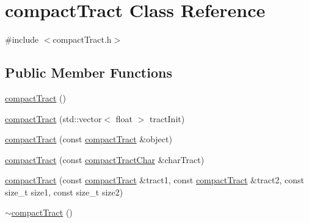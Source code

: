 \hypertarget{classcompactTract}{\section{compact\-Tract \-Class \-Reference}
\label{classcompactTract}
}


{\ttfamily \#include $<$compact\-Tract.\-h$>$}

\subsection*{\-Public \-Member \-Functions}
\begin{DoxyCompactItemize}
\item 
\hyperlink{classcompactTract_a768f98790c79a32ec890c2f8a860b868}{compact\-Tract} ()
\item 
\hyperlink{classcompactTract_a0df1b9bb6f933f77cb2a55b549944dec}{compact\-Tract} (std\-::vector$<$ float $>$ tract\-Init)
\item 
\hyperlink{classcompactTract_ab370799e5b1892c20e774ece5aae1988}{compact\-Tract} (const \hyperlink{classcompactTract}{compact\-Tract} \&object)
\item 
\hyperlink{classcompactTract_ae6dd8d553eecc27217c63338eafa155f}{compact\-Tract} (const \hyperlink{classcompactTractChar}{compact\-Tract\-Char} \&char\-Tract)
\item 
\hyperlink{classcompactTract_a62d9323e06f379909a198409b07b4fb3}{compact\-Tract} (const \hyperlink{classcompactTract}{compact\-Tract} \&tract1, const \hyperlink{classcompactTract}{compact\-Tract} \&tract2, const size\-\_\-t size1, const size\-\_\-t size2)
\item 
\hypertarget{classcompactTract_ab110a6e126e45b2507c5639439bbfbc1}{\hyperlink{classcompactTract_ab110a6e126e45b2507c5639439bbfbc1}{$\sim$compact\-Tract} ()}\label{classcompactTract_ab110a6e126e45b2507c5639439bbfbc1}


\end{DoxyCompactItemize}
